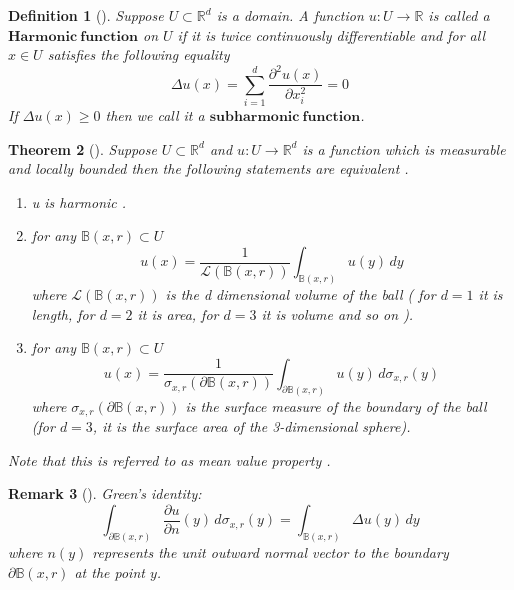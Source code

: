 \documentclass[11pt, a4paper, oneside]{report}
\numberwithin{equation}{section}
\newtheorem{theorem}{Theorem}[chapter]
\newtheorem{remark}[theorem]{Remark}
\newtheorem{definition}[theorem]{Definition}
\begin{document}
\begin{definition}[{\cite[Definition 3.1]{PeresMortersBook}}]
Suppose \(U \subset \mathbb{R}^d\) is a domain. A function \(u : U \to \mathbb{R}\) is called a \(\boldsymbol{Harmonic\ function}\) on \(U\) if it is twice continuously differentiable and for all \(x \in U\) satisfies the following equality \\
\[
\Delta u(x) = \sum_{i=1}^{d} \frac{\partial^2 u(x)}{\partial x_i^2} = 0
\]
If \(\Delta{u}(x) \geq 0\) then we call it a \(\boldsymbol{subharmonic\ function}\).
\end{definition}
\begin{theorem}[{\cite[Theorem 3.2]{PeresMortersBook}}]
Suppose \(U \subset \mathbb{R}^d\) and \(u : U \to \mathbb{R}^d\) is a function which is measurable and locally bounded then the following statements are equivalent .
\begin{enumerate}
 \item u is harmonic .
 \item for any \(\mathbb{B}(x,r)\subset U\)
 \[
u(x) = \frac{1}{\mathscr{L}(\mathbb{B}(x, r))} \int_{\mathbb{B}(x, r)} u(y) \, dy
\]
where \(\mathscr{L}(\mathbb{B}(x,r))\) is the d dimensional volume of the ball ( for \(d=1\) it is length, for \(d=2\) it is area, for \(d=3\) it is volume and so on ).
 \item for any \(\mathbb{B}(x,r) \subset U\)
\[
u(x) = \frac{1}{\sigma_{x,r}(\partial \mathbb{B}(x, r))} \int_{\partial \mathbb{B}(x, r)} u(y) \, d\sigma_{x,r}(y)
\]
where \(\sigma_{x,r}(\partial \mathbb{B}(x, r))\) is the surface measure of the boundary of the ball (for \(d = 3\), it is the surface area of the 3-dimensional sphere).
\end{enumerate}
Note that this is referred to as mean value property .
\end{theorem}
\begin{remark}[{\cite[Remark 3.3]{PeresMortersBook}}]
Green's identity:
\[
\int_{\partial \mathbb{B}(x, r)} \frac{\partial u}{\partial n}(y) \, d\sigma_{x,r}(y) = \int_{\mathbb{B}(x, r)} \Delta u(y) \, dy 
\]
where \( n(y) \) represents the unit outward normal vector to the boundary \( \partial \mathbb{B}(x, r) \) at the point \( y \).

\end{remark}
\end{document}
